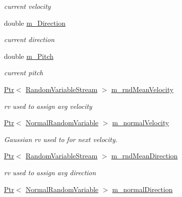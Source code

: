 \begin{DoxyCompactItemize}
\begin{DoxyCompactList}\small\item\em current velocity \end{DoxyCompactList}\item 
double \hyperlink{classns3_1_1GaussMarkovMobilityModel_aefd02209b40ab19df332f788ea7654c2}{m\+\_\+\+Direction}
\begin{DoxyCompactList}\small\item\em current direction \end{DoxyCompactList}\item 
double \hyperlink{classns3_1_1GaussMarkovMobilityModel_a0703ff7bcbeae86ef3e58284f20a6517}{m\+\_\+\+Pitch}
\begin{DoxyCompactList}\small\item\em current pitch \end{DoxyCompactList}\item 
\hyperlink{classns3_1_1Ptr}{Ptr}$<$ \hyperlink{classns3_1_1RandomVariableStream}{Random\+Variable\+Stream} $>$ \hyperlink{classns3_1_1GaussMarkovMobilityModel_a9b9673143fb0414e80eeb54587fd412d}{m\+\_\+rnd\+Mean\+Velocity}
\begin{DoxyCompactList}\small\item\em rv used to assign avg velocity \end{DoxyCompactList}\item 
\hyperlink{classns3_1_1Ptr}{Ptr}$<$ \hyperlink{classns3_1_1NormalRandomVariable}{Normal\+Random\+Variable} $>$ \hyperlink{classns3_1_1GaussMarkovMobilityModel_a68773ff0fbf46d9690a0b7b9a85f49ee}{m\+\_\+normal\+Velocity}
\begin{DoxyCompactList}\small\item\em Gaussian rv used to for next velocity. \end{DoxyCompactList}\item 
\hyperlink{classns3_1_1Ptr}{Ptr}$<$ \hyperlink{classns3_1_1RandomVariableStream}{Random\+Variable\+Stream} $>$ \hyperlink{classns3_1_1GaussMarkovMobilityModel_aca9f735142434714b98f842867219578}{m\+\_\+rnd\+Mean\+Direction}
\begin{DoxyCompactList}\small\item\em rv used to assign avg direction \end{DoxyCompactList}\item 
\hyperlink{classns3_1_1Ptr}{Ptr}$<$ \hyperlink{classns3_1_1NormalRandomVariable}{Normal\+Random\+Variable} $>$ \hyperlink{classns3_1_1GaussMarkovMobilityModel_a05f43bae64f0bd5185c9f8d6751c1fb5}{m\+\_\+normal\+Direction}

\end{DoxyCompactItemize}
